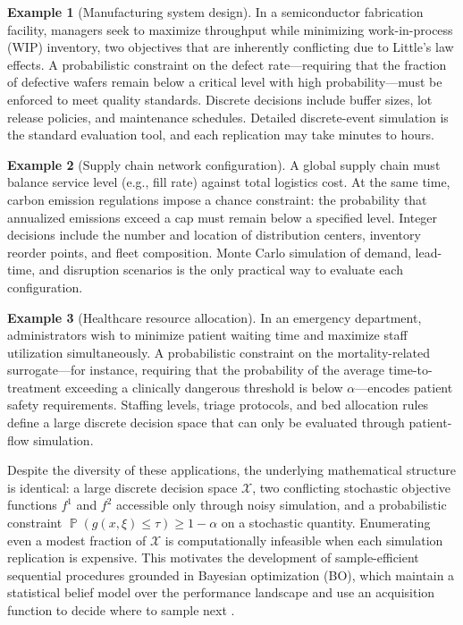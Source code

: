 \documentclass[12pt]{article}
\theoremstyle{plain}
\theoremstyle{definition}
\newtheorem{example}{Example}[section]
\theoremstyle{remark}
\DeclareMathOperator{\Prob}{\mathbb{P}}
\newcommand{\cX}{\mathcal{X}}
\begin{document}
\begin{example}[Manufacturing system design]\label{ex:manufacturing}
In a semiconductor fabrication facility, managers seek to maximize
throughput while minimizing work-in-process (WIP) inventory, two
objectives that are inherently conflicting due to Little's law
effects.  A probabilistic constraint on the defect rate---requiring
that the fraction of defective wafers remain below a critical level
with high probability---must be enforced to meet quality standards.
Discrete decisions include buffer sizes, lot release policies, and
maintenance schedules.  Detailed discrete-event simulation is the
standard evaluation tool, and each replication may take minutes to
hours.
\end{example}

\begin{example}[Supply chain network configuration]\label{ex:supplychain}
A global supply chain must balance service level (e.g., fill rate)
against total logistics cost.  At the same time, carbon emission
regulations impose a chance constraint: the probability that
annualized emissions exceed a cap must remain below a specified level.
Integer decisions include the number and location of distribution
centers, inventory reorder points, and fleet composition.  Monte Carlo
simulation of demand, lead-time, and disruption scenarios is the only
practical way to evaluate each configuration.
\end{example}

\begin{example}[Healthcare resource allocation]\label{ex:healthcare}
In an emergency department, administrators wish to minimize patient
waiting time and maximize staff utilization simultaneously.  A
probabilistic constraint on the mortality-related surrogate---for
instance, requiring that the probability of the average time-to-treatment
exceeding a clinically dangerous threshold is below $\alpha$---encodes
patient safety requirements.  Staffing levels, triage protocols, and
bed allocation rules define a large discrete decision space that can
only be evaluated through patient-flow simulation.
\end{example}

Despite the diversity of these applications, the underlying
mathematical structure is identical: a large discrete decision space
$\cX$, two conflicting stochastic objective functions $f^1$ and $f^2$
accessible only through noisy simulation, and a probabilistic
constraint $\Prob(g(x,\xi)\le\tau)\ge 1-\alpha$ on a stochastic
quantity.  Enumerating even a modest fraction of $\cX$ is
computationally infeasible when each simulation replication is
expensive.  This motivates the development of sample-efficient
sequential procedures grounded in Bayesian optimization (BO), which
maintain a statistical belief model over the performance landscape and
use an acquisition function to decide where to sample next
\citep{Forrester2009,Frazier2018tutorial}.
\end{document}
